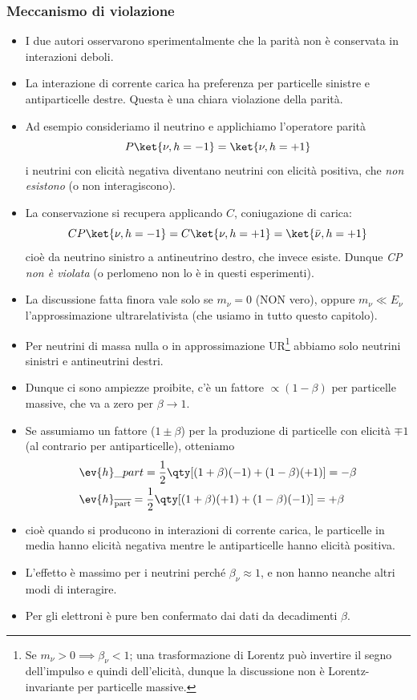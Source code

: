 \subsubsection{Meccanismo di violazione}
\begin{itemize}
    \item I due autori osservarono sperimentalmente che la parità non è conservata in interazioni deboli.
    \item La interazione di corrente carica ha preferenza per particelle sinistre e antiparticelle destre. Questa è una chiara violazione della parità.
    \item Ad esempio consideriamo il neutrino e applichiamo l'operatore parità
    \begin{equation*}
        P\ket{\nu,h=-1}=\ket{\nu,h=+1}
    \end{equation*}
    i neutrini con elicità negativa diventano neutrini con elicità positiva, che \textit{non esistono} (o non interagiscono).
    \item La conservazione si recupera applicando $C$, coniugazione di carica:
    \begin{equation*}
    CP\ket{\nu,h=-1}=C\ket{\nu,h=+1}=\ket{\bar\nu,h=+1}
    \end{equation*}
    cioè da neutrino sinistro a antineutrino destro, che invece esiste. Dunque \textit{CP non è violata} (o perlomeno non lo è in questi esperimenti).
    \item La discussione fatta finora vale solo se $m_\nu=0$ (NON vero), oppure $m_\nu\ll E_\nu$ l'approssimazione ultrarelativista (che usiamo in tutto questo capitolo).
    \item Per neutrini di massa nulla o in approssimazione UR\footnote{Se $m_\nu>0\implies\beta_\nu<1$; una trasformazione di Lorentz può invertire il segno dell'impulso e quindi dell'elicità, dunque la discussione non è Lorentz-invariante per particelle massive.} abbiamo solo neutrini sinistri e antineutrini destri.
    \item Dunque ci sono ampiezze proibite, c'è un fattore $\propto(1-\beta)$ per particelle massive, che va a zero per $\beta\to1$.
    \item Se assumiamo un fattore ($1\pm\beta$) per la produzione di particelle con elicità $\mp1$ (al contrario per antiparticelle), otteniamo
    \begin{align*}
    &\ev{h}\_{part}=\frac{1}{2}\qty[(1+\beta)(-1)+(1-\beta)(+1)]=-\beta \\
    &\ev{h}_{\overline{\textnormal{part}}}=\frac{1}{2}\qty[(1+\beta)(+1)+(1-\beta)(-1)]=+\beta
    \end{align*}
    \item cioè quando si producono in interazioni di corrente carica, le particelle in media hanno elicità negativa mentre le antiparticelle hanno elicità positiva.
    \item L'effetto è massimo per i neutrini perché $\beta_\nu\approx1$, e non hanno neanche altri modi di interagire.
    \item Per gli elettroni è pure ben confermato dai dati da decadimenti $\beta$.
\end{itemize}
